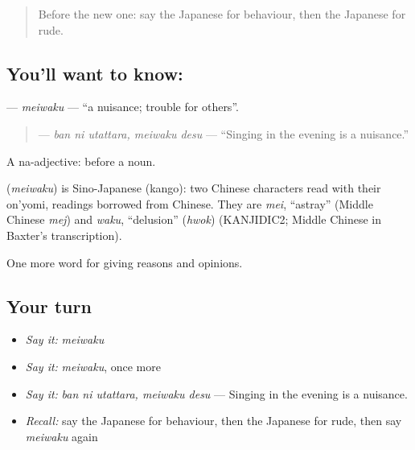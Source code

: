 \label{lesson:JA-C327-meiwaku}



\begin{quote}
Before the new one: say the Japanese for behaviour, then the Japanese for rude.
\end{quote}

\subsection*{You'll want to know: }
\textbf{} — \emph{meiwaku} — \textquotedblleft{}a nuisance; trouble for others\textquotedblright{}.

\begin{quote}
\textbf{ } — \emph{ban ni utattara, meiwaku desu} — \textquotedblleft{}Singing in the evening is a nuisance.\textquotedblright{}
\end{quote}

A na-adjective:  before a noun.

\begin{cousinweb}
\textbf{} (\emph{meiwaku}) is Sino-Japanese (kango): two Chinese characters read with their on'yomi, readings borrowed from Chinese. They are \emph{mei}, \textquotedblleft{}astray\textquotedblright{} (Middle Chinese \emph{mej}) and \emph{waku}, \textquotedblleft{}delusion\textquotedblright{} (\emph{hwok}) (KANJIDIC2; Middle Chinese in Baxter's transcription).
\end{cousinweb}

\begin{grammarlens}[title={What you've built}]
One more word for giving reasons and opinions.
\end{grammarlens}

\subsection*{Your turn}
\begin{itemize}
\raggedright
  \item \emph{Say it:} \emph{meiwaku}
  \item \emph{Say it:} \emph{meiwaku}, once more
  \item \emph{Say it:} \emph{ban ni utattara, meiwaku desu} — Singing in the evening is a nuisance.
  \item \emph{Recall:} say the Japanese for behaviour, then the Japanese for rude, then say \emph{meiwaku} again
\end{itemize}

